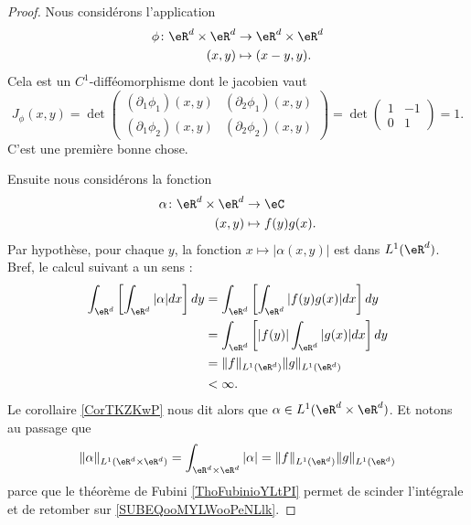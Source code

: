 \begin{proof}
    Nous considérons l'application
    \begin{equation}
        \begin{aligned}
            \phi\colon \eR^d\times \eR^d&\to \eR^d\times \eR^d \\
            (x,y)&\mapsto (x-y,y). 
        \end{aligned}
    \end{equation}
    Cela est un \( C^1\)-difféomorphisme dont le jacobien vaut
    \begin{equation}
        J_{\phi}(x,y)=\det\begin{pmatrix}
            (\partial_1\phi_1)(x,y)    &   (\partial_2\phi_1)(x,y)    \\ 
            (\partial_1\phi_2)(x,y)    &   (\partial_2\phi_2)(x,y)    
        \end{pmatrix}=\det\begin{pmatrix}
            1    &   -1    \\ 
            0    &   1    
        \end{pmatrix}=1.
    \end{equation}
    C'est une première bonne chose.
    
    Ensuite nous considérons la fonction
    \begin{equation}
        \begin{aligned}
            \alpha\colon \eR^d\times \eR^d&\to \eC \\
            (x,y)&\mapsto f(y)g(x). 
        \end{aligned}
    \end{equation}
    Par hypothèse, pour chaque \( y\), la fonction \( x\mapsto |\alpha(x,y)|\) est dans \( L^1(\eR^d)\). Bref, le calcul suivant a un sens :
    \begin{subequations}
        \begin{align}
            \int_{\eR^d}\left[ \int_{\eR^d}| \alpha |dx \right]dy&=\int_{\eR^d}\left[ \int_{\eR^d}| f(y)g(x) |dx \right]dy\\
            &=\int_{\eR^d}\left[ | f(y) |\int_{\eR^d}| g(x) |dx \right]dy\\
            &=\| f \|_{L^1(\eR^d)}\| g \|_{L^1(\eR^d)}  \label{SUBEQooMYLWooPeNLlk}\\
            &<\infty.
        \end{align}
    \end{subequations}
    Le corollaire \ref{CorTKZKwP} nous dit alors que \( \alpha\in L^1(\eR^d\times \eR^d)\). Et notons au passage que
    \begin{equation}        \label{EQooLCWNooHLLdRd}
        \| \alpha \|_{L^1(\eR^d\times \eR^d)} =\int_{\eR^d\times \eR^d}| \alpha | =\| f \|_{L^1(\eR^d)}\| g \|_{L^1(\eR^d)}
    \end{equation}
    parce que le théorème de Fubini \ref{ThoFubinioYLtPI} permet de scinder l'intégrale et de retomber sur \eqref{SUBEQooMYLWooPeNLlk}.
    

\end{proof}
